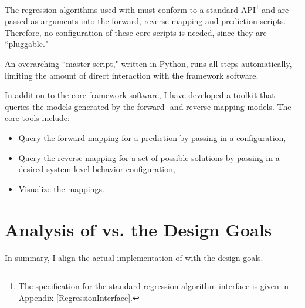 The regression algorithms used with \fw must conform to a standard API\footnote{The specification for the standard regression algorithm interface is given in Appendix \ref{RegressionInterface}.} and are passed as arguments into the forward, reverse mapping and prediction scripts.
Therefore, no configuration of these core scripts is needed, since they are ``pluggable."

An overarching ``master script," written in Python, runs all steps automatically, limiting the amount of direct interaction with the framework software.

In addition to the core framework software, I have developed a toolkit that queries the models generated by the forward- and reverse-mapping models.
The core tools include:
\begin{itemize}
   \item Query the forward mapping for a prediction by passing in a configuration,
   \item Query the reverse mapping for a set of possible solutions by passing in a desired system-level behavior configuration,
   \item Visualize the mappings.
\end{itemize}






\section{Analysis of \fw  vs. the Design Goals}
In summary, I align the actual implementation of \fw with the design goals.



